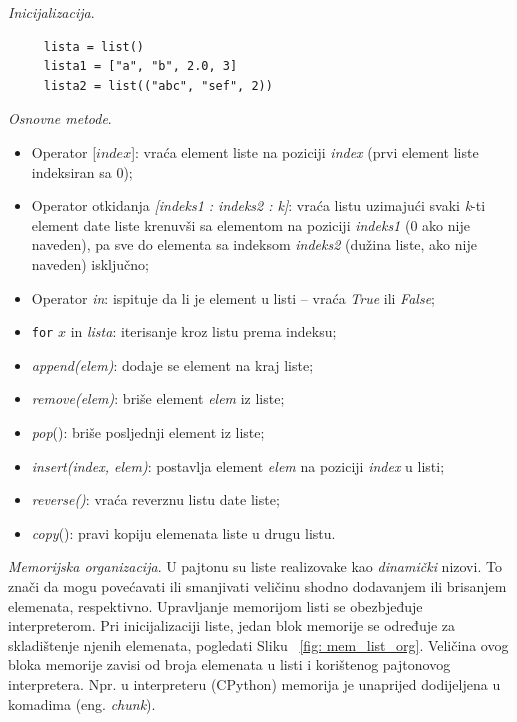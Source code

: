 \textit{Inicijalizacija}.

\begin{verbatim}
	 lista = list()
	 lista1 = ["a", "b", 2.0, 3]
	 lista2 = list(("abc", "sef", 2))
\end{verbatim}

\textit{Osnovne metode}.   

\begin{itemize}
	\item Operator [$index$]: vraća element liste na poziciji \textit{index} (prvi element liste indeksiran sa 0); 
	\item Operator otkidanja \textit{[indeks1 : indeks2 : k]}: vraća listu uzimajući svaki \textit{k}-ti  element date liste  krenuvši sa elementom na poziciji \textit{indeks1} (0 ako nije naveden),  pa sve do elementa sa indeksom \textit{indeks2} (dužina liste, ako nije naveden) isključno; 
	\item Operator \textit{in}: ispituje da li je element u listi -- vraća \emph{True} ili \emph{False};
	\item \texttt{for} $x$ in \emph{lista}: iterisanje kroz listu prema indeksu; 
	\item \textit{append(elem)}: dodaje se element na kraj liste;
	\item  \textit{remove(elem)}: briše element \textit{elem} iz liste;
	\item  \textit{pop}(): briše posljednji element iz liste;
	\item  \textit{insert(index, elem)}: postavlja element \textit{elem} na poziciji \textit{index} u listi;
	\item  \textit{reverse()}: vraća reverznu  listu date liste; 
	\item \textit{copy}(): pravi kopiju elemenata liste u drugu listu. 
 \end{itemize}

\textit{Memorijska organizacija}.  U pajtonu su liste realizovake kao \textit{dinamički} nizovi. To znači da mogu povećavati ili smanjivati veličinu shodno dodavanjem ili brisanjem elemenata, respektivno. Upravljanje memorijom listi se obezbjeđuje interpreterom.  Pri inicijalizaciji liste, jedan blok memorije se određuje za skladištenje njenih elemenata, pogledati Sliku~	\ref{fig: mem_list_org}.  Veličina ovog bloka memorije zavisi od broja elemenata u listi i korištenog pajtonovog  interpretera.  Npr. u interpreteru (CPython)  memorija je unaprijed dodijeljena u komadima (eng. \textit{chunk}).


